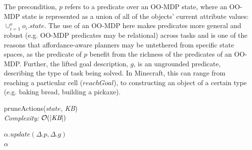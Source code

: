 \documentclass[]{article}
\newcommand{\stnote}[1]{\textcolor{Blue}{\textbf{ST: #1}}}
\newcommand{\jmnote}[1]{\textcolor{Green}{\textbf{JM: #1}}}
\newcommand{\dgnote}[1]{\textcolor{Orange}{\textbf{DG: #1}}}
\begin{document}
The precondition, $p$ refers to a predicate over an OO-MDP state, where an OO-MDP state is represented
as a union of all of the objects' current attribute values:
$\cup_{i = 1}^o o_i.state$.  The use of an OO-MDP here makes
predicates more general and robust (e.g. OO-MDP predicates may be relational) 
across tasks and is one of the reasons that affordance-aware 
planners may be untethered from specific state spaces, as the predicate of
$p$  benefit from the richness of the predicates of an OO-MDP. Further, the 
lifted goal description, $g$, is an ungrounded predicate, describing the type of task being solved. In Minecraft,
this can range from reaching a particular cell ($reachGoal$), to constructing
an object of a certain type (e.g. baking bread, building a pickaxe).


\begin{algorithm}
  \caption{pruneActions($state$, {\it KB}) \\ {\it Complexity:} $\mathcal{O}(|\text{{\it KB}}|)$}
  \begin{algorithmic}[1]
    \State $\alpha.update(\Delta.p, \Delta.g)$
    \EndIf
    \EndFor \\
    \Return $\alpha$
  \end{algorithmic}
  \label{alg:prune_actions}
\end{algorithm}
\end{document}
